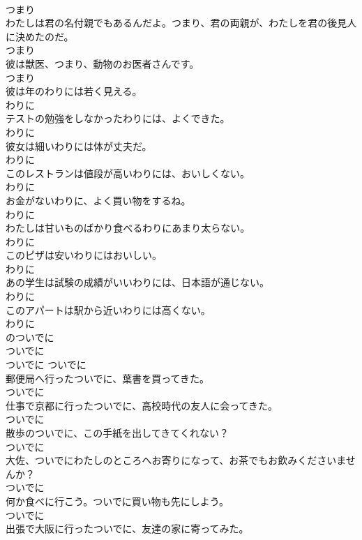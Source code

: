 \documentclass[8pt]{extreport}
\begin{document}
\begin{CJK}{UTF8}{min}
\\	つまり	
\\	わたしは君の名付親でもあるんだよ。つまり、君の両親が、わたしを君の後見人に決めたのだ。	
\\	つまり	
\\	彼は獣医、つまり、動物のお医者さんです。	
\\	つまり	
\\	彼は年のわりには若く見える。	
\\	わりに	
\\	テストの勉強をしなかったわりには、よくできた。	
\\	わりに	
\\	彼女は細いわりには体が丈夫だ。	
\\	わりに	
\\	このレストランは値段が高いわりには、おいしくない。	
\\	わりに	
\\	お金がないわりに、よく買い物をするね。	
\\	わりに	
\\	わたしは甘いものばかり食べるわりにあまり太らない。	
\\	わりに	
\\	このピザは安いわりにはおいしい。	
\\	わりに	
\\	あの学生は試験の成績がいいわりには、日本語が通じない。	
\\	わりに	
\\	このアパートは駅から近いわりには高くない。	
\\	わりに	
\\	のついでに	
\\	ついでに	
\\	ついでに	ついでに	
\\	郵便局へ行ったついでに、葉書を買ってきた。	
\\	ついでに	
\\	仕事で京都に行ったついでに、高校時代の友人に会ってきた。	
\\	ついでに	
\\	散歩のついでに、この手紙を出してきてくれない？	
\\	ついでに	
\\	大佐、ついでにわたしのところへお寄りになって、お茶でもお飲みくださいませんか？	
\\	ついでに	
\\	何か食べに行こう。ついでに買い物も先にしよう。	
\\	ついでに	
\\	出張で大阪に行ったついでに、友達の家に寄ってみた。	

\end{CJK}
\end{document}
